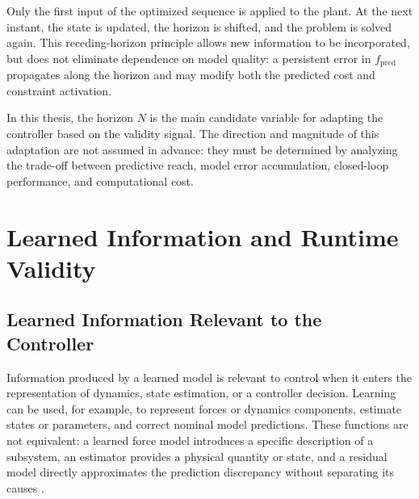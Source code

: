 \documentclass[12pt,a4paper]{report}
\begin{document}
Only the first input of the optimized sequence is applied to the plant. At the next instant, the state is updated, the horizon is shifted, and the problem is solved again. This receding-horizon principle allows new information to be incorporated, but does not eliminate dependence on model quality: a persistent error in $f_{\mathrm{pred}}$ propagates along the horizon and may modify both the predicted cost and constraint activation.

In this thesis, the horizon $N$ is the main candidate variable for adapting the controller based on the validity signal. The direction and magnitude of this adaptation are not assumed in advance: they must be determined by analyzing the trade-off between predictive reach, model error accumulation, closed-loop performance, and computational cost.


\chapter{Learned Information and Runtime Validity}

\section{Learned Information Relevant to the Controller}
\label{sec:informacion_aprendida_control}

%

Information produced by a learned model is relevant to control when it enters the representation of dynamics, state estimation, or a controller decision. Learning can be used, for example, to represent forces or dynamics components, estimate states or parameters, and correct nominal model predictions. These functions are not equivalent: a learned force model introduces a specific description of a subsystem, an estimator provides a physical quantity or state, and a residual model directly approximates the prediction discrepancy without separating its causes \cite{Zhou2025Hybrid,Bertipaglia2024An,Kabzan2019LearningBased}.
\end{document}
